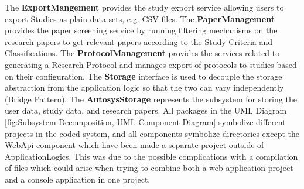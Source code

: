 The \textbf{ExportMangement} provides the study export service allowing users to export Studies as plain data sets, e.g. CSV files.
The \textbf{PaperManagement} provides the paper screening service by running filtering mechanisms on the research papers to get relevant papers according to the Study Criteria and Classifications.
The \textbf{ProtocolManagement} provides the services related to generating a Research Protocol and manages export of protocols to studies based on their configuration. 
The\textbf{ Storage} interface is used to decouple the storage abstraction from the application logic so that the two can vary independently (Bridge Pattern). 
The \textbf{AutosysStorage} represents the subsystem for storing the user data, study data, and research papers.
All packages in the UML Diagram \ref{fig:Subsystem Decomposition, UML Component Diagram} symbolize different projects in the coded system, and all components symbolize directories except the WebApi component which have been made a separate project outside of ApplicationLogics. This was due to the possible complications with a compilation of files which could arise when trying to combine both a web application project and a console application in one project.
